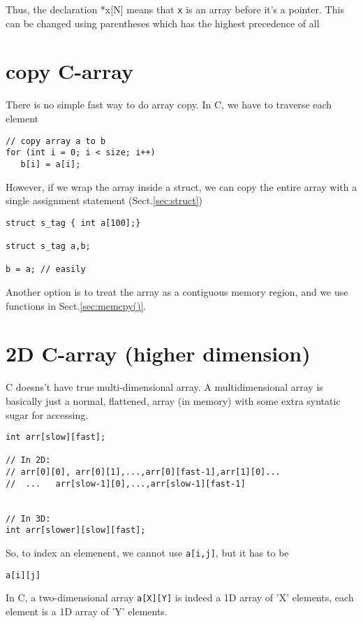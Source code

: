 Thus, the declaration *x[N] means that \verb!x! is an
array before it's a pointer. This can be changed using parentheses which has the
highest precedence of all



\section{copy C-array}
\label{sec:copy_C-array}

There is no simple fast way to do array copy. In C, we have to traverse each
element
\begin{verbatim}
// copy array a to b
for (int i = 0; i < size; i++)
   b[i] = a[i];
\end{verbatim}

However, if we wrap the array inside a struct, we can copy the entire array
with  a single assignment statement (Sect.\ref{sec:struct})
\begin{verbatim}
struct s_tag { int a[100];}

struct s_tag a,b;

b = a; // easily
\end{verbatim}

Another option is to treat the array as a contiguous memory region, and we use
functions in Sect.\ref{sec:memcpy()}.

\section{2D C-array (higher dimension)}
\label{sec:C_array_2D}

C doesns't have true multi-dimensional array.
A multidimensional array is basically just a normal, flattened, array (in
memory) with some extra syntatic sugar for accessing.

\begin{verbatim}
int arr[slow][fast];

// In 2D:
// arr[0][0], arr[0][1],...,arr[0][fast-1],arr[1][0]...
//  ...   arr[slow-1][0],...,arr[slow-1][fast-1]


// In 3D:
int arr[slower][slow][fast];
\end{verbatim}

So, to index an elemenent, we cannot use  \verb!a[i,j]!, but it has to be
\begin{verbatim}
a[i][j]
\end{verbatim}
In C, a two-dimensional array \verb!a[X][Y]! is indeed a 1D array of 'X'
elements, each element is a 1D array of 'Y' elements. 


